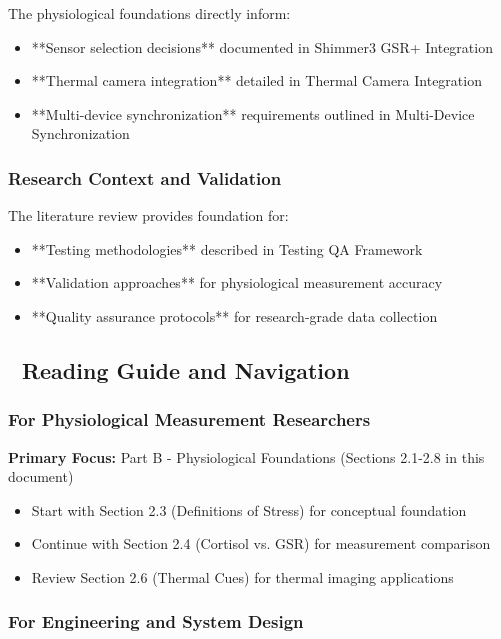 \documentclass[11pt,a4paper]{article}
\begin{document}
The physiological foundations directly inform:

\begin{itemize}
\item **Sensor selection decisions** documented
  in Shimmer3 GSR+ Integration
\item **Thermal camera integration** detailed
  in Thermal Camera Integration
\item **Multi-device synchronization** requirements outlined
  in Multi-Device Synchronization

\end{itemize}
\subsubsection{Research Context and Validation}

The literature review provides foundation for:

\begin{itemize}
\item **Testing methodologies** described in Testing QA Framework
\item **Validation approaches** for physiological measurement accuracy
\item **Quality assurance protocols** for research-grade data collection

\end{itemize}
\subsection{📖 Reading Guide and Navigation}

\subsubsection{For Physiological Measurement Researchers}

\textbf{Primary Focus:} Part B - Physiological Foundations (Sections 2.1-2.8 in this document)

\begin{itemize}
\item Start with Section 2.3 (Definitions of Stress) for conceptual foundation
\item Continue with Section 2.4 (Cortisol vs. GSR) for measurement comparison
\item Review Section 2.6 (Thermal Cues) for thermal imaging applications

\end{itemize}
\subsubsection{For Engineering and System Design}
\end{document}
